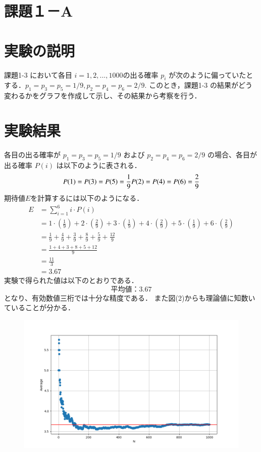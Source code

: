 \documentclass[fleqn, a4paper. 12pt]{ltjsarticle} %
\begin{document}
\section*{課題１－A}
\section*{実験の説明}
課題1-3 において各目 $i=1,2,...,1000  $の出る確率 $p_i$ が次のように偏っていたとする．$p_1 = p_3 =
p_5 = 1/9, p_2 = p_4 = p_6 = 2/9$. このとき，課題1-3 の結果がどう変わるかをグラフを作成して示し、その結果から考察を行う．
\section*{実験結果}
各目の出る確率が $p_1 = p_3 = p_5 = 1/9$ および $p_2 = p_4 = p_6 = 2/9$ の場合、各目が出る確率 $P(i)$ は以下のように表される．
\begin{equation}
  P(1) = P(3) = P(5) = \frac{1}{9}\\
  P(2) = P(4) = P(6) = \frac{2}{9}
\end{equation}
期待値$E$を計算するには以下のようになる．
\begin{align*}
  E &= \sum_{i=1}^{6} i \cdot P(i) \\[8pt]
  &= 1 \cdot \left(\frac{1}{9}\right) + 2 \cdot \left(\frac{2}{9}\right) + 3 \cdot \left(\frac{1}{9}\right) + 4 \cdot \left(\frac{2}{9}\right) + 5 \cdot \left(\frac{1}{9}\right) + 6 \cdot \left(\frac{2}{9}\right) \\[8pt]
  &= \frac{1}{9} + \frac{4}{9} + \frac{3}{9} + \frac{8}{9} + \frac{5}{9} + \frac{12}{9} \\[8pt]
  &= \frac{1 + 4 + 3 + 8 + 5 + 12}{9} \\[8pt]
  &= \frac{11}{3} \\[8pt]
  &= 3.67
\end{align*}
実験で得られた値は以下のとおりである．
\begin{equation}
  平均値：3.67
\end{equation}
となり、有効数値三桁では十分な精度である．
また図(2)からも理論値に知数いていることが分かる．
\begin{figure}[tb]
  \centering
  \includegraphics[width=\textwidth]{my_plot1-A.png}
  \label{f2}
  \caption{}
\end{figure}
\end{document}
